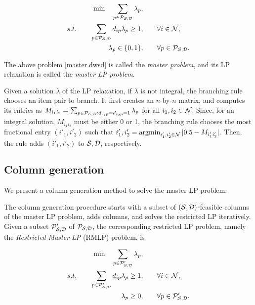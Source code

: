 \begin{subequations}
 \label{master.dwsd}
 \begin{align}
 \min \quad \sum_{p \in \mathcal P_{\mathcal S, \mathcal D} } \lambda_p, \qquad&\\
 s.t. \qquad \sum_{p \in \mathcal P_{\mathcal S, \mathcal D} } d_{ip} \lambda_p \ge 1, \qquad& \forall i \in \mathcal N, \label{master.dwsd.sc}\\
 \qquad \lambda_p \in \{0,1\}, \qquad& \forall p \in \mathcal P_{\mathcal S, \mathcal D} .
 \end{align}
 \end{subequations}

The above problem \eqref{master.dwsd} is called the \textit{master problem}, and its LP relaxation is called the \textit{master LP problem}.

Given a solution $\lambda$ of the LP relaxation, if $\lambda$ is not integral, the branching rule chooses an item pair to branch. It first creates an $n$-by-$n$ matrix, and computes its entries as $M_{i_1i_2}= \sum_{p \in \mathcal P_{\mathcal S,\mathcal D}:  d_{i_1p} = d_{i_2p} = 1}\lambda_p$ for all $i_1,i_2 \in \mathcal N$.  Since, for an integral solution, $M_{i_1i_2}$ must be either 0 or 1, the branching rule chooses the most fractional entry $(i'_1,i'_2)$ such that $i'_1,i'_2 = \operatorname{argmin}_{i'_1, i'_2 \in \mathcal N} |0.5-M_{i'_1i'_2}|$. Then, the rule adds $(i'_1,i'_2)$ to $\mathcal S,\mathcal D$, respectively.



\subsection{Column generation}

\label{sec.col}

We present a column generation method to solve the master LP problem.

The column generation procedure starts with a subset of \((\mathcal S, \mathcal D)\)-feasible columns of the master LP problem, adds columns, and solves the restricted LP iteratively. Given a subset \(\mathcal P'_{\mathcal S,\mathcal D}\) of \(\mathcal P_{\mathcal S,\mathcal D}\), the corresponding restricted LP problem, namely the \textit{Restricted Master LP } (RMLP) problem, is

 \begin{subequations}
 \label{master.dw.rel}
 \begin{align}
 \min \quad \sum_{p \in \mathcal P'_{\mathcal S,\mathcal D}} \lambda_p, \qquad&\\
 s.t. \qquad \sum_{p \in \mathcal P'_{\mathcal S,\mathcal D}} d_{ip} \lambda_p \ge 1, \qquad& \forall i \in \mathcal N, \label{master.dwrel.sc}\\
 \qquad \lambda_p \ge 0, \qquad& \forall p \in \mathcal P'_{\mathcal S,\mathcal D}.
 \end{align}
 \end{subequations}

